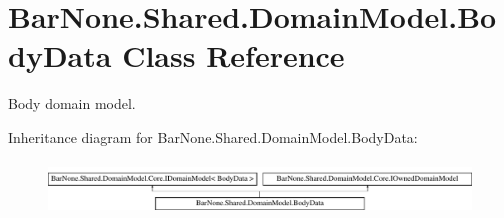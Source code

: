 \hypertarget{class_bar_none_1_1_shared_1_1_domain_model_1_1_body_data}{}\section{Bar\+None.\+Shared.\+Domain\+Model.\+Body\+Data Class Reference}
\label{class_bar_none_1_1_shared_1_1_domain_model_1_1_body_data}


Body domain model.  


Inheritance diagram for Bar\+None.\+Shared.\+Domain\+Model.\+Body\+Data\+:\begin{figure}[H]
\begin{center}
\leavevmode
\includegraphics[height=1.432225cm]{class_bar_none_1_1_shared_1_1_domain_model_1_1_body_data}
\end{center}
\end{figure}
